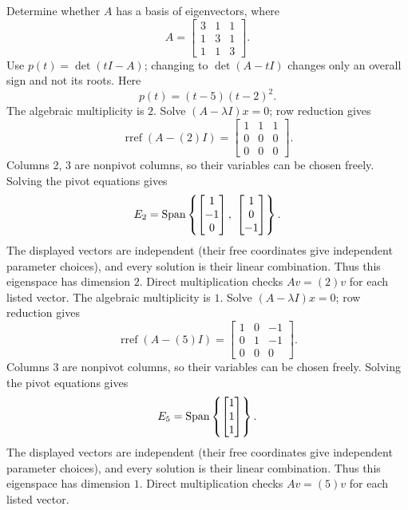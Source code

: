 \goal Determine whether $A$ has a basis of eigenvectors, where
\[A=\begin{bmatrix}3&1&1\\1&3&1\\1&1&3\end{bmatrix}.\]
Use $p(t)=\det(tI-A)$; changing to $\det(A-tI)$ changes only an overall sign and not its roots. Here
\[p(t)=\left(t - 5\right) \left(t - 2\right)^{2}.\]
The algebraic multiplicity is $2$. Solve $(A-\lambda I)x=0$; row reduction gives
\[\operatorname{rref}(A-(2)I)=\begin{bmatrix}1&1&1\\0&0&0\\0&0&0\end{bmatrix}.\]
Columns 2, 3 are nonpivot columns, so their variables can be chosen freely. Solving the pivot equations gives
\[E_{2}=\Span\left\{\begin{bmatrix}1\\-1\\0\end{bmatrix},\ \begin{bmatrix}1\\0\\-1\end{bmatrix}\right\}.\]
The displayed vectors are independent (their free coordinates give independent parameter choices), and every solution is their linear combination. Thus this eigenspace has dimension $2$. Direct multiplication checks $Av=(2)v$ for each listed vector.
The algebraic multiplicity is $1$. Solve $(A-\lambda I)x=0$; row reduction gives
\[\operatorname{rref}(A-(5)I)=\begin{bmatrix}1&0&-1\\0&1&-1\\0&0&0\end{bmatrix}.\]
Columns 3 are nonpivot columns, so their variables can be chosen freely. Solving the pivot equations gives
\[E_{5}=\operatorname{Span}\left\{\begin{bmatrix}1\\1\\1\end{bmatrix}\right\}.\]
The displayed vectors are independent (their free coordinates give independent parameter choices), and every solution is their linear combination. Thus this eigenspace has dimension $1$. Direct multiplication checks $Av=(5)v$ for each listed vector.
